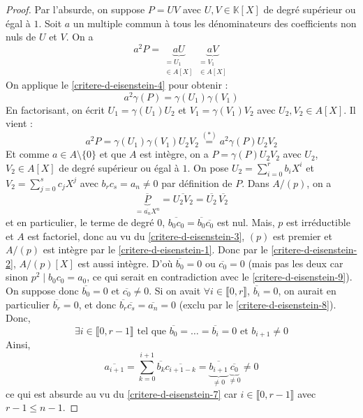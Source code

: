 	\begin{proof}
		Par l'absurde, on suppose $P = UV$ avec $U, V \in \mathbb{K}[X]$ de degré supérieur ou égal à $1$. Soit $a$ un multiple commun à tous les dénominateurs des coefficients non nuls de $U$ et $V$. On a
		\[ a^2 P = \underbrace{a U}_{\substack{= U_1 \\ \in A[X]}} \underbrace{a V}_{\substack{= V_1 \\ \in A[X]}} \]
		On applique le \cref{critere-d-eisenstein-4} pour obtenir :
		\[ a^2 \gamma(P) = \gamma(U_1) \gamma(V_1) \tag{$*$} \]
		En factorisant, on écrit $U_1 = \gamma(U_1) U_2$ et $V_1 = \gamma(V_1) V_2$ avec $U_2, V_2 \in A[X]$. Il vient :
		\[ a^2 P = \gamma(U_1) \gamma(V_1) U_2 V_2 \overset{(*)}{=} a^2 \gamma(P) U_2 V_2 \]
		Et comme $a \in A \setminus \{ 0 \}$ et que $A$ est intègre, on a $P = \gamma(P) U_2 V_2$ avec $U_2$, $V_2 \in A[X]$ de degré supérieur ou égal à $1$.
		\newpar
		On pose $U_2 = \sum_{i=0}^r b_i X^i$ et $V_2 = \sum_{j=0}^s c_j X^j$ avec $b_r c_s = a_n \neq 0$ par définition de $P$. Dans $A/(p)$, on a
		\[ \underbrace{\overline{P}}_{= \overline{a_n} X^n} = \overline{U_2 V_2} = \overline{U_2} \, \overline{V_2} \]
		et en particulier, le terme de degré $0$, $\overline{b_0 c_0} = \overline{b_0} \overline{c_0}$ est nul. Mais, $p$ est irréductible et $A$ est factoriel, donc au vu du \cref{critere-d-eisenstein-3}, $(p)$ est premier et $A/(p)$ est intègre par le \cref{critere-d-eisenstein-1}. Donc par le \cref{critere-d-eisenstein-2}, $A/(p)[X]$ est aussi intègre. D'où $\overline{b_0} = 0$ ou $\overline{c_0} = 0$ (mais pas les deux car sinon $p^2 \mid b_0 c_0 = a_0$, ce qui serait en contradiction avec le \cref{critere-d-eisenstein-9}).
		\newpar
		On suppose donc $\overline{b_0} = 0$ et $\overline{c_0} \neq 0$. Si on avait $\forall i \in \llbracket 0, r \rrbracket$, $\overline{b_i} = 0$, on aurait en particulier $\overline{b_r} = 0$, et donc $\overline{b_r} \overline{c_s} = \overline{a_n} = 0$ (exclu par le \cref{critere-d-eisenstein-8}). Donc,
		\[ \exists i \in \llbracket 0, r-1 \rrbracket \text{ tel que } \overline{b_0} = \dots = \overline{b_i} = 0 \text{ et } b_{i+1} \neq 0 \]
		Ainsi,
		\[ \overline{a_{i+1}} = \sum_{k=0}^{i+1} \overline{b_k} \overline{c_{i+1-k}} = \underbrace{\overline{b_{i+1}}}_{\neq 0} \underbrace{\overline{c_0}}_{\neq 0} \neq 0 \]
		ce qui est absurde au vu du \cref{critere-d-eisenstein-7} car $i \in \llbracket 0, r-1 \rrbracket$ avec $r-1 \leq n-1$.
	\end{proof}


